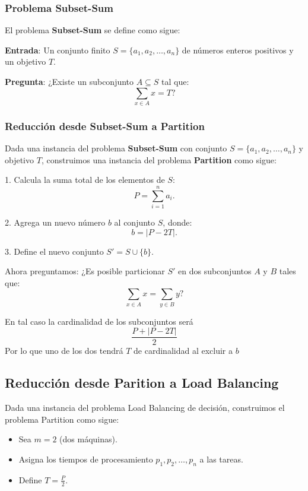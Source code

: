 \documentclass{report}
\begin{document}
	\subsubsection*{Problema Subset-Sum}
	
	El problema \textbf{Subset-Sum} se define como sigue:
	
	\textbf{Entrada}: Un conjunto finito $ S = \{a_1, a_2, \dots, a_n\} $ de números enteros positivos y un objetivo $ T $.
	
	\textbf{Pregunta}: ¿Existe un subconjunto $ A \subseteq S $ tal que:
	\[
	\sum_{x \in A} x = T?
	\]
	
	\subsubsection*{Reducción desde Subset-Sum a Partition}
	
	Dada una instancia del problema \textbf{Subset-Sum} con conjunto $ S = \{a_1, a_2, \dots, a_n\} $ y objetivo $ T $, construimos una instancia del problema \textbf{Partition} como sigue:
	
	1. Calcula la suma total de los elementos de $ S $:
	\[
	P = \sum_{i=1}^n a_i.
	\]
	
	2. Agrega un nuevo número $ b $ al conjunto $ S $, donde:
	\[
	b = |P - 2T|.
	\]
	
	3. Define el nuevo conjunto $ S' = S \cup \{b\} $.
	
	Ahora preguntamos: ¿Es posible particionar $ S' $ en dos subconjuntos $ A $ y $ B $ tales que:
	\[
	\sum_{x \in A} x = \sum_{y \in B} y?
	\]
	
	En tal caso la cardinalidad de los subconjuntos será $$\frac{P + |P - 2T|}{2}$$ Por lo que uno de los dos tendrá $T$ de cardinalidad al excluir a $b$
	
	
	
	
	\subsection*{Reducción desde Parition a Load Balancing}
	Dada una instancia del problema Load Balancing de decisión, construimos el problema Partition como sigue:
	\begin{itemize}
		\item Sea $ m = 2 $ (dos máquinas).
		\item Asigna los tiempos de procesamiento $ p_1, p_2, \dots, p_n $ a las tareas.
		\item Define $ T = \frac{P}{2} $.
	\end{itemize}
	
\end{document}
